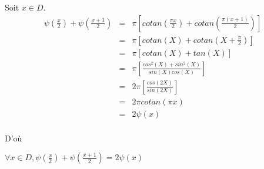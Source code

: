Soit $x\in D$.\\
\[
  \begin{array}{rcl}
    \psi\left(\frac{x}{2}\right) + \psi\left(\frac{x+1}{2}\right) & = & \pi \left[ cotan\left(\frac{\pi x}{2}\right) + cotan\left(\frac{\pi(x+1)}{2}\right)\right] \\
                                                                  & = & \pi \left[ cotan\left(X\right) + cotan\left(X + \frac{\pi}{2}\right)\right]                \\
                                                                  & = & \pi \left[ cotan\left(X\right) + tan\left(X \right)\right]                                 \\
                                                                  & = & \pi \left[ \frac{cos^2(X)+sin^2(X)}{sin(X)cos(X)}  \right]                                 \\
                                                                  & = & 2\pi \left[ \frac{cos(2X)}{sin(2X)}  \right]                                               \\
                                                                  & = & 2\pi cotan(\pi x)                                                                          \\
                                                                  & = & 2\psi\left(x\right)                                                                        \\
  \end{array}
\]

D'où
\begin{result}
  $\forall x \in D, \psi\left(\frac{x}{2}\right) + \psi\left(\frac{x+1}{2}\right) = 2\psi(x)$
\end{result}

